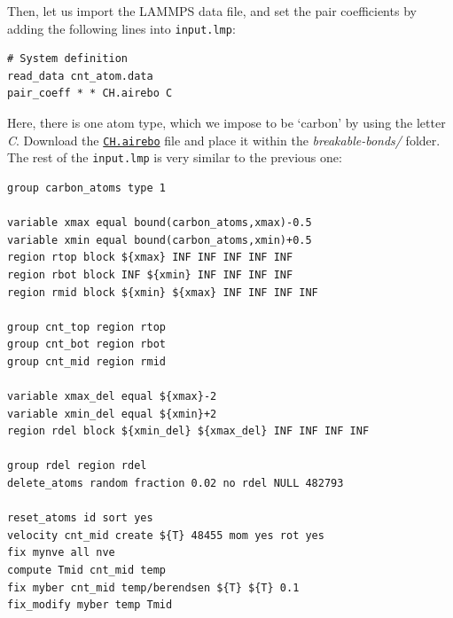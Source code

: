 \documentclass[9pt,tutorial]{livecoms}
\newcommand{\flecmd}[1]{\textcolor{command}{\texttt{#1}}} %
\newcommand{\dwlcmd}[1]{\textcolor{download}{\texttt{#1}}} %
\newcommand{\filepath}{https://raw.githubusercontent.com/lammpstutorials/lammpstutorials-article/main/files/}
\begin{document}
Then, let us import the LAMMPS data file, and set the pair coefficients by adding
the following lines into \flecmd{input.lmp}:
\begin{lstlisting}
# System definition
read_data cnt_atom.data
pair_coeff * * CH.airebo C
\end{lstlisting}
Here, there is one atom type, which we impose to be `carbon' by using
the letter \textit{C}. Download the \href{\filepath tutorial2/breakable-bonds/CH.airebo}{\dwlcmd{CH.airebo}}
file and place it within the \textit{breakable-bonds/} folder. The rest of the
\flecmd{input.lmp} is very similar to the previous one:

\begin{lstlisting}
group carbon_atoms type 1

variable xmax equal bound(carbon_atoms,xmax)-0.5
variable xmin equal bound(carbon_atoms,xmin)+0.5
region rtop block ${xmax} INF INF INF INF INF
region rbot block INF ${xmin} INF INF INF INF
region rmid block ${xmin} ${xmax} INF INF INF INF

group cnt_top region rtop
group cnt_bot region rbot
group cnt_mid region rmid

variable xmax_del equal ${xmax}-2
variable xmin_del equal ${xmin}+2
region rdel block ${xmin_del} ${xmax_del} INF INF INF INF

group rdel region rdel
delete_atoms random fraction 0.02 no rdel NULL 482793

reset_atoms id sort yes
velocity cnt_mid create ${T} 48455 mom yes rot yes
fix mynve all nve
compute Tmid cnt_mid temp
fix myber cnt_mid temp/berendsen ${T} ${T} 0.1
fix_modify myber temp Tmid
\end{lstlisting}
\end{document}
